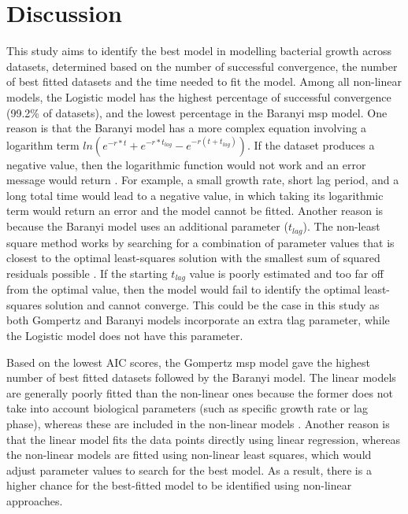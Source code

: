 \documentclass[11pt]{article}
\begin{document}
\section{Discussion}
This study aims to identify the best model in modelling bacterial growth across datasets, determined based on the number of successful convergence, the number of best fitted datasets and the time needed to fit the model. Among all non-linear models, the Logistic model has the highest percentage of successful convergence (99.2\% of datasets), and the lowest percentage in the Baranyi msp model. One reason is that the Baranyi model has a more complex equation involving a logarithm term $ln(e^{-r*t}+e^{-r*t_{lag}}- e^{-r(t+t_{lag})})$. If the dataset produces a negative value, then the logarithmic function would not work and an error message would return \cite{wiscombe_exponential-sum_1977}. For example, a small growth rate, short lag period, and a long total time would lead to a negative value, in which taking its logarithmic term would return an error and the model cannot be fitted. Another reason is because the Baranyi model uses an additional parameter (\(t_{lag}\)). The non-least square method works by searching for a combination of parameter values that is closest to the optimal least-squares solution with the smallest sum of squared residuals possible \cite{see_parameter_2018}. If the starting \(t_{lag}\) value is poorly estimated and too far off from the optimal value, then the model would fail to identify the optimal least-squares solution and cannot converge. This could be the case in this study as both Gompertz and Baranyi models incorporate an extra tlag parameter, while the Logistic model does not have this parameter.  
\vspace{\baselineskip}

Based on the lowest AIC scores, the Gompertz msp model gave the highest number of best fitted datasets followed by the Baranyi model. The linear models are generally poorly fitted than the non-linear ones because the former does not take into account biological parameters (such as specific growth rate or lag phase), whereas these are included in the non-linear models \cite{peleg_microbial_2011}. Another reason is that the linear model fits the data points directly using linear regression, whereas the non-linear models are fitted using non-linear least squares, which would adjust parameter values to search for the best model. As a result, there is a higher chance for the best-fitted model to be identified using non-linear approaches. 
\vspace{\baselineskip}
\end{document}
